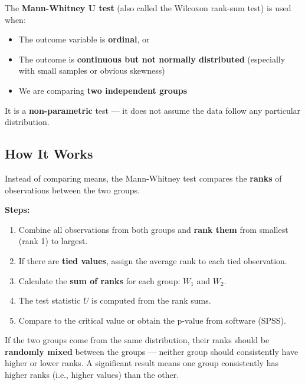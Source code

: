 \documentclass[
  12pt,
  letterpaper,
]{book}
\providecommand{\tightlist}{%
  \setlength{\itemsep}{0pt}\setlength{\parskip}{0pt}}
\begin{document}
The \textbf{Mann-Whitney U test} (also called the Wilcoxon rank-sum
test) is used when:

\begin{itemize}
\tightlist
\item
  The outcome variable is \textbf{ordinal}, or
\item
  The outcome is \textbf{continuous but not normally distributed}
  (especially with small samples or obvious skewness)
\item
  We are comparing \textbf{two independent groups}
\end{itemize}

It is a \textbf{non-parametric} test --- it does not assume the data
follow any particular distribution.

\subsection{How It Works}\label{how-it-works}

Instead of comparing means, the Mann-Whitney test compares the
\textbf{ranks} of observations between the two groups.

\textbf{Steps:}

\begin{enumerate}
\def\labelenumi{\arabic{enumi}.}
\tightlist
\item
  Combine all observations from both groups and \textbf{rank them} from
  smallest (rank 1) to largest.
\item
  If there are \textbf{tied values}, assign the average rank to each
  tied observation.
\item
  Calculate the \textbf{sum of ranks} for each group: \(W_1\) and
  \(W_2\).
\item
  The test statistic \(U\) is computed from the rank sums.
\item
  Compare to the critical value or obtain the p-value from software
  (SPSS).
\end{enumerate}

\begin{tcolorbox}[enhanced jigsaw, arc=.35mm, bottomrule=.15mm, bottomtitle=1mm, breakable, colback=white, colbacktitle=quarto-callout-tip-color!10!white, colframe=quarto-callout-tip-color-frame, coltitle=black, left=2mm, leftrule=.75mm, opacityback=0, opacitybacktitle=0.6, rightrule=.15mm, title={💡 Intuition Behind the Test}, titlerule=0mm, toprule=.15mm, toptitle=1mm]

If the two groups come from the same distribution, their ranks should be
\textbf{randomly mixed} between the groups --- neither group should
consistently have higher or lower ranks. A significant result means one
group consistently has higher ranks (i.e., higher values) than the
other.

\end{tcolorbox}
\end{document}
